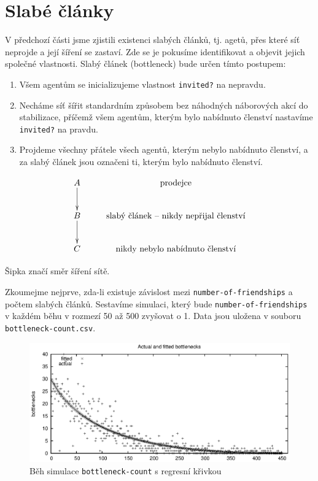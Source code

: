 \documentclass[a4wide,12pt]{report}
\begin{document}
\section{Slabé články}
V předchozí části jsme zjistili existenci slabých článků, tj. agetů, přes které síť neprojde a její šíření se zastaví. Zde se je pokusíme identifikovat a objevit jejich společné vlastnosti. Slabý článek (bottleneck) bude určen tímto postupem:
\begin{enumerate}
\item Všem agentům se inicializujeme vlastnost \texttt{invited?} na nepravdu.
\item Necháme síť šířit standardním způsobem bez náhodných náborových akcí do stabilizace, příčemž všem agentům, kterým bylo nabídnuto členství nastavíme \texttt{invited?} na pravdu.
\item Projdeme všechny přátele všech agentů, kterým nebylo nabídnuto členství, a za slabý článek jsou označeni ti, kterým bylo nabídnuto členství.
\end{enumerate}
\begin{displaymath}
    \xymatrix{ A \ar[d] & \text{prodejce}  \\
               B \ar[d] & \text{slabý článek -- nikdy nepřijal členství} \\
               C & \text{nikdy nebylo nabídnuto členství} }
\end{displaymath}
\begin{center}
Šipka značí směr šíření sítě.
\end{center}
Zkoumejme nejprve, zda-li existuje závislost mezi \texttt{number-of-friendships} a počtem slabých článků. Sestavíme simulaci, který bude \texttt{number-of-friendships} v každém běhu v rozmezí 50 až 500 zvyšovat o 1. Data jsou uložena v souboru \texttt{bottleneck-count.csv}.
\begin{figure}[h]
  \centering
  \includegraphics{bottleneck-count.eps}
  \caption{Běh simulace \texttt{bottleneck-count} s regresní křivkou}
  \label{fig:bottleneck-count}
\end{figure}
\end{document}
